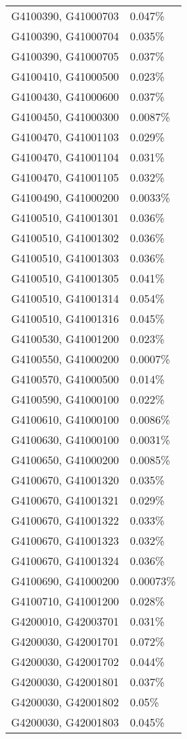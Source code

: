 \begin{longtable}[]{@{}ll@{}}
G4100390, G41000703 & 0.047\% \\
G4100390, G41000704 & 0.035\% \\
G4100390, G41000705 & 0.037\% \\
G4100410, G41000500 & 0.023\% \\
G4100430, G41000600 & 0.037\% \\
G4100450, G41000300 & 0.0087\% \\
G4100470, G41001103 & 0.029\% \\
G4100470, G41001104 & 0.031\% \\
G4100470, G41001105 & 0.032\% \\
G4100490, G41000200 & 0.0033\% \\
G4100510, G41001301 & 0.036\% \\
G4100510, G41001302 & 0.036\% \\
G4100510, G41001303 & 0.036\% \\
G4100510, G41001305 & 0.041\% \\
G4100510, G41001314 & 0.054\% \\
G4100510, G41001316 & 0.045\% \\
G4100530, G41001200 & 0.023\% \\
G4100550, G41000200 & 0.0007\% \\
G4100570, G41000500 & 0.014\% \\
G4100590, G41000100 & 0.022\% \\
G4100610, G41000100 & 0.0086\% \\
G4100630, G41000100 & 0.0031\% \\
G4100650, G41000200 & 0.0085\% \\
G4100670, G41001320 & 0.035\% \\
G4100670, G41001321 & 0.029\% \\
G4100670, G41001322 & 0.033\% \\
G4100670, G41001323 & 0.032\% \\
G4100670, G41001324 & 0.036\% \\
G4100690, G41000200 & 0.00073\% \\
G4100710, G41001200 & 0.028\% \\
G4200010, G42003701 & 0.031\% \\
G4200030, G42001701 & 0.072\% \\
G4200030, G42001702 & 0.044\% \\
G4200030, G42001801 & 0.037\% \\
G4200030, G42001802 & 0.05\% \\
G4200030, G42001803 & 0.045\% \\

\end{longtable}
